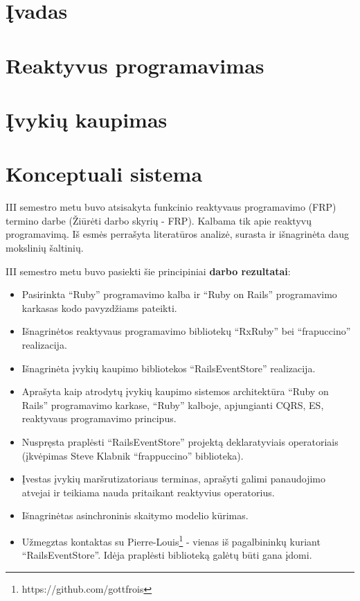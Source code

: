 \documentclass{VUMIFPSmagistrinis}
\begin{document}

\tableofcontents

\section{Įvadas}


\section{Reaktyvus programavimas}


\section{Įvykių kaupimas}


\section{Konceptuali sistema}



III semestro metu buvo atsisakyta funkcinio reaktyvaus programavimo (FRP) termino darbe (Žiūrėti darbo skyrių - FRP). Kalbama tik apie reaktyvų programavimą. Iš esmės perrašyta literatūros analizė, surasta ir išnagrinėta daug mokslinių šaltinių.

III semestro metu buvo pasiekti šie principiniai \textbf{darbo rezultatai}:

\begin{itemize}
  \item Pasirinkta ``Ruby'' programavimo kalba ir ``Ruby on Rails'' programavimo karkasas kodo pavyzdžiams pateikti.
  \item Išnagrinėtos reaktyvaus programavimo bibliotekų ``RxRuby'' bei ``frapuccino'' realizacija.
  \item Išnagrinėta įvykių kaupimo bibliotekos ``RailsEventStore'' realizacija.
  \item Aprašyta kaip atrodytų įvykių kaupimo sistemos architektūra ``Ruby on Rails'' programavimo karkase, ``Ruby'' kalboje, apjungianti CQRS, ES, reaktyvaus programavimo principus.
  \item Nuspręsta praplėsti ``RailsEventStore'' projektą deklaratyviais operatoriais (įkvėpimas Steve Klabnik ``frappuccino'' biblioteka).
  \item Įvestas įvykių maršrutizatoriaus terminas, aprašyti galimi panaudojimo atvejai ir teikiama nauda pritaikant reaktyvius operatorius.
  \item Išnagrinėtas asinchroninis skaitymo modelio kūrimas.
  \item Užmegztas kontaktas su Pierre-Louis\footnote{https://github.com/gottfrois} - vienas iš pagalbininkų kuriant ``RailsEventStore''. Idėja praplėsti biblioteką galėtų būti gana įdomi.
\end{itemize}
\end{document}
